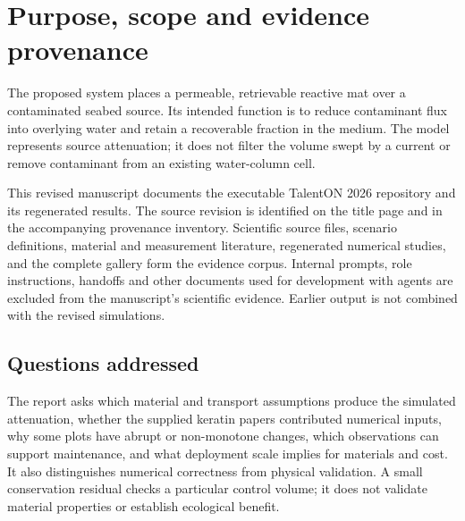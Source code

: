 \section{Purpose, scope and evidence provenance}
\label{sec:scope}
The proposed system places a permeable, retrievable reactive mat over a contaminated seabed source. Its intended function is to reduce contaminant flux into overlying water and retain a recoverable fraction in the medium. The model represents source attenuation; it does not filter the volume swept by a current or remove contaminant from an existing water-column cell.

This revised manuscript documents the executable TalentON 2026 repository and its regenerated results.\citep{repository} The source revision is identified on the title page and in the accompanying provenance inventory. Scientific source files, scenario definitions, material and measurement literature, regenerated numerical studies, and the complete gallery form the evidence corpus. Internal prompts, role instructions, handoffs and other documents used for development with agents are excluded from the manuscript's scientific evidence. Earlier output is not combined with the revised simulations.

\subsection{Questions addressed}
The report asks which material and transport assumptions produce the simulated attenuation, whether the supplied keratin papers contributed numerical inputs, why some plots have abrupt or non-monotone changes, which observations can support maintenance, and what deployment scale implies for materials and cost. It also distinguishes numerical correctness from physical validation. A small conservation residual checks a particular control volume; it does not validate material properties or establish ecological benefit.

